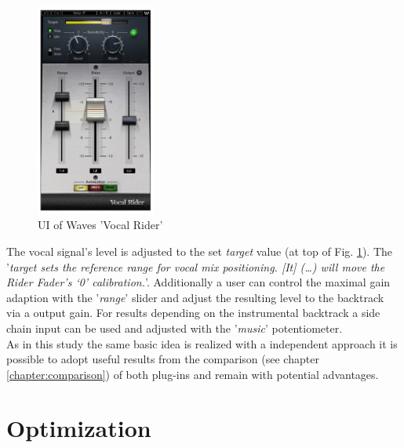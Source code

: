 \begin{figure}[H]
\includegraphics[width=0.35\textwidth]{images/vocalRiderUI}
	\centering
	\caption{UI of Waves 'Vocal Rider'\cite{vocalRiderM}}
	\label{VRUI}
\end{figure}

The vocal signal's level is adjusted to the set \textit{target} value (at top of Fig. \ref{VRUI}). The '\textit{target sets the reference range for vocal mix positioning. [It] (…) will move the Rider Fader’s ‘0’ calibration.}'\cite{vocalRiderM}. Additionally a user can control the maximal gain adaption with the '\textit{range}' slider and adjust the resulting level to the backtrack via a output gain. For results depending on the instrumental backtrack a side chain input can be used and adjusted with the '\textit{music}' potentiometer.\\
As in this study the same basic idea is realized with a independent approach it is possible to adopt useful results from the comparison (see chapter \ref{chapter:comparison}) of both plug-ins and remain with potential advantages.\\

\section{Optimization}

